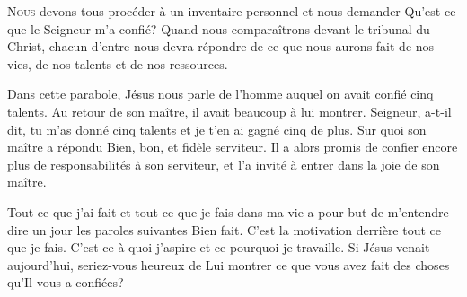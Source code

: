 


\lettrine{N}{ous} devons tous procéder à un inventaire personnel
 et nous demander\frcolon{} 
 \Og Qu'est-ce-que le Seigneur m'a confié? \Fg{}
 Quand nous comparaîtrons devant le tribunal du Christ,
 chacun d'entre nous devra répondre de ce que nous aurons fait de nos vies,
 de nos talents et de nos ressources. 


Dans cette parabole, Jésus nous parle de l'homme auquel on avait confié
 cinq talents. Au retour de son maître, il avait beaucoup à lui montrer.
 \Og Seigneur, a-t-il dit, 
 tu m'as donné cinq talents et je t'en ai gagné cinq de plus. \Fg{}
 Sur quoi son maître a répondu\frcolon{} 
 \Og Bien, bon, et fidèle serviteur. \Fg{}
 Il a alors promis de confier encore plus de responsabilités à son serviteur,
 et l'a invité à entrer dans \Og la joie de son maître. \Fg{}

Tout ce que j'ai fait et tout ce que je fais dans ma vie
 a pour but de m'entendre dire un jour les paroles suivantes\frcolon{} 
 \Og Bien fait. \Fg{} 
 C'est la motivation derrière tout ce que je fais.
 C'est ce à quoi j'aspire et ce pourquoi je travaille.
 Si Jésus venait aujourd'hui, seriez-vous heureux de Lui montrer
 ce que vous avez fait des choses qu'Il vous a confiées? 

\dvrule






